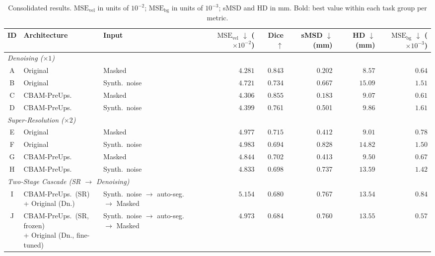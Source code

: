 \documentclass[11pt]{article}
\begin{document}
\begin{table}[!htbp]
  \centering
  \caption{Consolidated results.  $\text{MSE}_\text{vel}$ in units of $10^{-2}$;
  $\text{MSE}_\text{bg}$ in units of $10^{-3}$; sMSD and HD in mm.
  Bold: best value within each task group per metric.}
  \label{tab:summary}
  \setlength{\tabcolsep}{4pt}
  \small
  \begin{tabular}{cll l rrrrr}
    \toprule
    ID & Architecture & Input & &
      \makecell{$\text{MSE}_\text{vel}$ $\downarrow$\\(${\times}10^{-2}$)} &
      Dice $\uparrow$ &
      \makecell{sMSD $\downarrow$\\(mm)} &
      \makecell{HD $\downarrow$\\(mm)} &
      \makecell{$\text{MSE}_\text{bg}$ $\downarrow$\\(${\times}10^{-3}$)} \\
    \midrule
    \multicolumn{9}{l}{\textit{Denoising ($\times 1$)}} \\
    \midrule
    A & Original     & Masked        & & $\mathbf{4.281}$ & 0.843 & 0.202 & $\mathbf{8.57}$ & $0.64$ \\
    B & Original     & Synth.\ noise & & $4.721$ & 0.734 & 0.667 & $15.09$ & $1.51$ \\
    C & CBAM-PreUps. & Masked        & & $4.306$ & $\mathbf{0.855}$ & $\mathbf{0.183}$ & $9.07$ & $\mathbf{0.61}$ \\
    D & CBAM-PreUps. & Synth.\ noise & & $4.399$ & 0.761 & 0.501 & $9.86$ & $1.61$ \\
    \midrule
    \multicolumn{9}{l}{\textit{Super-Resolution ($\times 2$)}} \\
    \midrule
    E & Original     & Masked        & & $4.977$ & $\mathbf{0.715}$ & $\mathbf{0.412}$ & $\mathbf{9.01}$ & $0.78$ \\
    F & Original     & Synth.\ noise & & $4.983$ & 0.694 & 0.828 & $14.82$ & $1.50$ \\
    G & CBAM-PreUps. & Masked        & & $4.844$ & 0.702 & 0.413 & $9.50$ & $\mathbf{0.67}$ \\
    H & CBAM-PreUps. & Synth.\ noise & & $\mathbf{4.833}$ & 0.698 & 0.737 & $13.59$ & $1.42$ \\
    \midrule
    \multicolumn{9}{l}{\textit{Two-Stage Cascade (SR $\to$ Denoising)}} \\
    \midrule
    I & \makecell[l]{CBAM-PreUps.\ (SR)\\+ Original (Dn.)} & \makecell[l]{Synth.\ noise $\to$\\auto-seg.\ $\to$ Masked} & & $5.154$ & 0.680 & 0.767 & $13.54$ & $0.84$ \\
    J & \makecell[l]{CBAM-PreUps.\ (SR, frozen)\\+ Original (Dn., fine-tuned)} & \makecell[l]{Synth.\ noise $\to$\\auto-seg.\ $\to$ Masked} & & $4.973$ & 0.684 & 0.760 & $13.55$ & $\mathbf{0.57}$ \\
    \bottomrule
  \end{tabular}
\end{table}
\end{document}
